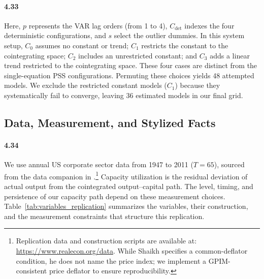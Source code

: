 \paragraph{4.33}
Here, $p$ represents the VAR lag orders (from 1 to 4), $C_{\text{det}}$ indexes the four deterministic configurations, and $s$ select the outlier dummies. In this system setup, $C_0$ assumes no constant or trend; $C_1$ restricts the constant to the cointegrating space; $C_2$ includes an unrestricted constant; and $C_3$ adds a linear trend restricted to the cointegrating space. These four cases are distinct from the single-equation PSS configurations. Permuting these choices yields 48 attempted models. We exclude the restricted constant models ($C_1$) because they systematically fail to converge, leaving 36 estimated models in our final grid.

\subsection{Data, Measurement, and Stylized Facts}
\label{subsec:data_measurement}

\paragraph{4.34}
We use annual US corporate sector data from 1947 to 2011 ($T = 65$), sourced from the data companion in \citet{Shaikh2016}.\footnote{Replication data and construction scripts are available at: \url{https://www.realecon.org/data}. While Shaikh specifies a common-deflator condition, he does not name the price index; we implement a GPIM-consistent price deflator to ensure reproducibility.} Capacity utilization is the residual deviation of actual output from the cointegrated output--capital path. The level, timing, and persistence of our capacity path depend on these measurement choices. Table~\ref{tab:variables_replication} summarizes the variables, their construction, and the measurement constraints that structure this replication.

